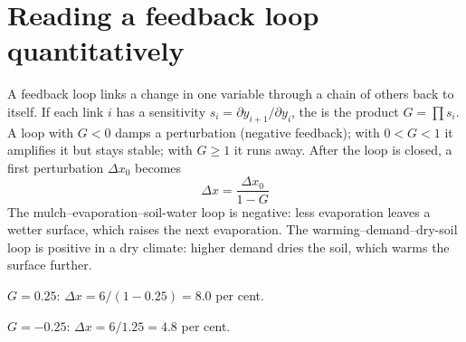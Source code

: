 \section{Reading a feedback loop quantitatively}\label{sec:at-loop}
A feedback loop links a change in one variable through a chain of others back to itself. If each link $i$ has a sensitivity $s_i=\partial y_{i+1}/\partial y_i$, the  is the product $G=\prod s_i$. A loop with $G<0$ damps a perturbation (negative feedback); with $0<G<1$ it amplifies it but stays stable; with $G\geq1$ it runs away. After the loop is closed, a first perturbation $\Delta x_0$ becomes
\begin{equation}\label{eq:at-gain}\boxed{\Delta x=\frac{\Delta x_0}{1-G}}\end{equation}
The mulch--evaporation--soil-water loop is negative: less evaporation leaves a wetter surface, which raises the next evaporation. The warming--demand--dry-soil loop is positive in a dry climate: higher demand dries the soil, which warms the surface further.

\sol
\par\noindent $G=0.25$: $\Delta x=6/(1-0.25)=8.0$ per cent.\finans
\par\noindent $G=-0.25$: $\Delta x=6/1.25=4.8$ per cent.\finans

